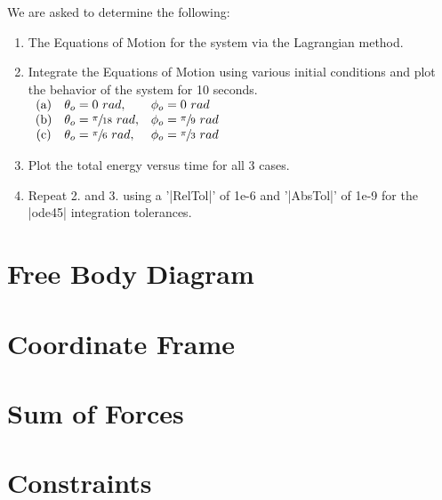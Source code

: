 \documentclass[12pt]{report}
\begin{document}
\begin{flushleft}
We are asked to determine the following: \\
\begin{enumerate}
  \item The Equations of Motion for the system via the Lagrangian method.
  \item Integrate the Equations of Motion using various initial conditions and plot
  the behavior of the system for 10 seconds. \\
  \vspace{2ex}
  $
    \begin{array}{cll}
    \text{(a)} & \theta_o = 0~rad, & \phi_o = 0~rad \\
    \text{(b)} & \theta_o = \sfrac{\pi}{18}~rad, & \phi_o = \sfrac{\pi}{9}~rad \\
    \text{(c)} & \theta_o = \sfrac{\pi}{6}~rad, & \phi_o = \sfrac{\pi}{3}~rad \\
  \end{array}
  $
  \item Plot the total energy versus time for all 3 cases.
  \item Repeat 2. and 3. using a '|RelTol|' of 1e-6 and '|AbsTol|' of 1e-9 for the
  |ode45| integration tolerances.
\end{enumerate}

\section{Free Body Diagram}

\section{Coordinate Frame} \label{section:coord}

\section{Sum of Forces}
\section{Constraints}

\end{flushleft}
\end{document}
